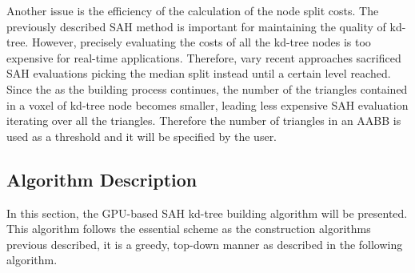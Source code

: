Another issue is the efficiency of the calculation of the node split costs. The previously described SAH method is important for maintaining the quality of kd-tree. However, precisely evaluating the costs of all the kd-tree nodes is too expensive for real-time applications. Therefore, vary recent approaches sacrificed SAH evaluations picking the median split instead until a certain level reached. Since the as the building process continues, the number of the triangles contained in a voxel of kd-tree node becomes smaller, leading less expensive SAH evaluation iterating over all the triangles. Therefore the number of triangles in an AABB is used as a threshold and it will be specified by the user. 

\subsection{Algorithm Description}
In this section, the GPU-based SAH kd-tree building algorithm will be presented. This algorithm follows the essential scheme as the construction algorithms previous described, it is a greedy, top-down manner as described in the following algorithm. 

